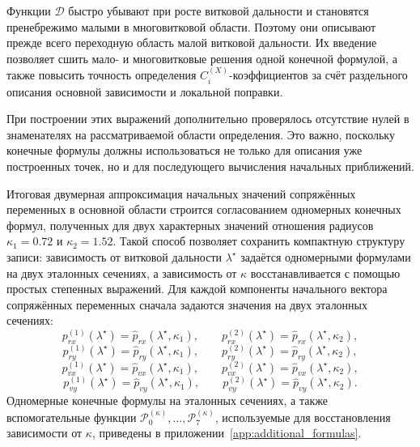 Функции $\mathcal D$ быстро убывают при росте витковой дальности и становятся пренебрежимо малыми в многовитковой области. Поэтому они описывают прежде всего переходную область малой витковой дальности. Их введение позволяет сшить мало- и многовитковые решения одной конечной формулой, а также повысить точность определения $C_i^{(X)}$-коэффициентов за счёт раздельного описания основной зависимости и локальной поправки.

При построении этих выражений дополнительно проверялось отсутствие нулей в знаменателях на рассматриваемой области определения. Это важно, поскольку конечные формулы должны использоваться не только для описания уже построенных точек, но и для последующего вычисления начальных приближений.

Итоговая двумерная аппроксимация начальных значений сопряжённых переменных в основной области строится согласованием одномерных конечных формул, полученных для двух характерных значений отношения радиусов \(\kappa_1=0.72\) и \(\kappa_2=1.52\).
Такой способ позволяет сохранить компактную структуру записи: зависимость от витковой дальности \(\lambda^\star\) задаётся одномерными формулами на двух эталонных сечениях, а зависимость от \(\kappa\) восстанавливается с помощью простых степенных выражений.
Для каждой компоненты начального вектора сопряжённых переменных сначала
задаются значения на двух эталонных сечениях:
\begin{equation}
	p_{rx}^{(1)}(\lambda^\star)
	=
	\widehat p_{rx}(\lambda^\star,\kappa_1),
	\qquad
	p_{rx}^{(2)}(\lambda^\star)
	=
	\widehat p_{rx}(\lambda^\star,\kappa_2),
	\label{eq:chap2_prx_reference_sections}
\end{equation}
\begin{equation}
	p_{ry}^{(1)}(\lambda^\star)
	=
	\widehat p_{ry}(\lambda^\star,\kappa_1),
	\qquad
	p_{ry}^{(2)}(\lambda^\star)
	=
	\widehat p_{ry}(\lambda^\star,\kappa_2),
	\label{eq:chap2_pry_reference_sections}
\end{equation}
\begin{equation}
	p_{vx}^{(1)}(\lambda^\star)
	=
	\widehat p_{vx}(\lambda^\star,\kappa_1),
	\qquad
	p_{vx}^{(2)}(\lambda^\star)
	=
	\widehat p_{vx}(\lambda^\star,\kappa_2),
	\label{eq:chap2_pvx_reference_sections}
\end{equation}
\begin{equation}
	p_{vy}^{(1)}(\lambda^\star)
	=
	\widehat p_{vy}(\lambda^\star,\kappa_1),
	\qquad
	p_{vy}^{(2)}(\lambda^\star)
	=
	\widehat p_{vy}(\lambda^\star,\kappa_2).
	\label{eq:chap2_pvy_reference_sections}
\end{equation}
Одномерные конечные формулы на эталонных сечениях, а также вспомогательные функции \(\mathcal P_0^{(\kappa)},\ldots,\mathcal P_7^{(\kappa)}\), используемые для восстановления зависимости от \(\kappa\), приведены в приложении~\ref{app:additional_formulas}.

